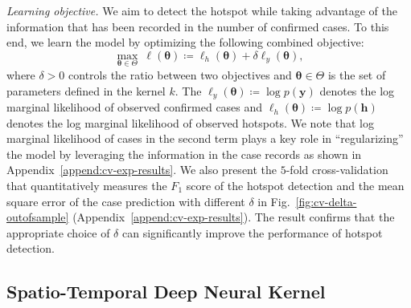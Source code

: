 \documentclass[journal]{IEEEtran}
\begin{document}
\vspace{.1in}
\noindent\emph{Learning objective.}
We aim to detect the hotspot while taking advantage of the information that has been recorded in the number of confirmed cases. To this end, we learn the model by optimizing the following combined objective:
\begin{equation}
    \underset{\boldsymbol \theta \in \Theta}{\max} ~\ell(\boldsymbol{\theta}) \coloneqq \ell_{h}({\boldsymbol \theta}) + \delta \ell_{y}(\boldsymbol \theta),
    \label{eq:objective}
\end{equation}
where $\delta>0$ controls the ratio between two objectives and $\boldsymbol{\theta} \in \Theta$ is the set of parameters defined in the kernel $k$. 
The $\ell_{y}({\boldsymbol \theta}) \coloneqq \log p(\mathbf{y})$ denotes the log marginal likelihood of observed confirmed cases and $\ell_{h}({\boldsymbol \theta}) \coloneqq \log p(\mathbf{h})$ denotes the log marginal likelihood of observed hotspots.
We note that log marginal likelihood of cases in the second term plays a key role in ``regularizing'' the model by leveraging the information in the case records as shown in Appendix~\ref{append:cv-exp-results}.
We also present the $5$-fold cross-validation that quantitatively measures the $F_1$ score of the hotspot detection and the mean square error of the case prediction with different $\delta$ in Fig.~\ref{fig:cv-delta-outofsample} (Appendix~\ref{append:cv-exp-results}). The result confirms that the appropriate choice of $\delta$ can significantly improve the performance of hotspot detection. 


\subsection{Spatio-Temporal Deep Neural Kernel}
\end{document}
